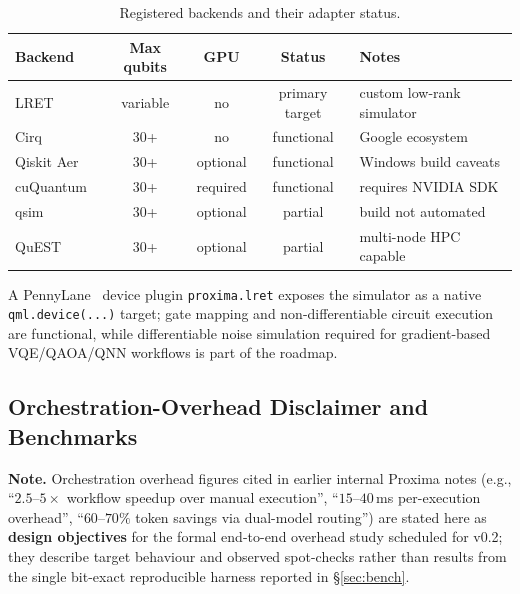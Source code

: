 \documentclass[11pt,a4paper]{article}
\begin{document}
\begin{table}[!h]
\centering
\small
\renewcommand{\arraystretch}{1.2}
\caption{Registered backends and their adapter status.}
\label{tab:proxima-backends}
\begin{tabular}{@{}lcccl@{}}
\toprule
\textbf{Backend} & \textbf{Max qubits} & \textbf{GPU} & \textbf{Status} & \textbf{Notes} \\
\midrule
LRET                                      & variable & no       & primary target & custom low-rank simulator \\
Cirq~\cite{cirq}                          & 30+      & no       & functional     & Google ecosystem \\
Qiskit Aer~\cite{javadi2024qiskit}        & 30+      & optional & functional     & Windows build caveats \\
cuQuantum~\cite{bayraktar2023cuquantum}   & 30+      & required & functional     & requires NVIDIA SDK \\
qsim~\cite{qsim}                          & 30+      & optional & partial        & build not automated \\
QuEST~\cite{jones2019quest}               & 30+      & optional & partial        & multi-node HPC capable \\
\bottomrule
\end{tabular}
\end{table}

A PennyLane~\cite{bergholm2018pennylane} device plugin \texttt{proxima.lret}
exposes the simulator as a native \texttt{qml.device(...)} target; gate mapping
and non-differentiable circuit execution are functional, while differentiable
noise simulation required for gradient-based VQE/QAOA/QNN workflows is part of
the roadmap.

\subsection{Orchestration-Overhead Disclaimer and Benchmarks}

\begin{infobox}
\textbf{Note.} Orchestration overhead figures cited in earlier internal Proxima
notes (e.g., ``$2.5\text{--}5\times$ workflow speedup over manual execution'',
``$15\text{--}40$\,ms per-execution overhead'', ``$60\text{--}70\%$ token
savings via dual-model routing'') are stated here as \textbf{design objectives}
for the formal end-to-end overhead study scheduled for v0.2; they describe
target behaviour and observed spot-checks rather than results from the single
bit-exact reproducible harness reported in \S\ref{sec:bench}.
\end{infobox}
\end{document}
